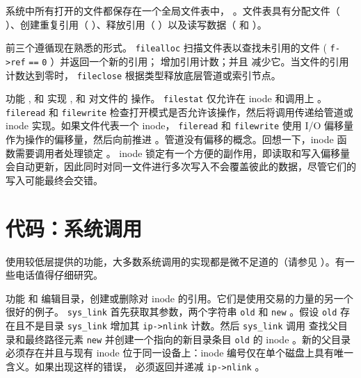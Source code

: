 系统中所有打开的文件都保存在一个全局文件表中，
        。文件表具有分配文件（        ）、创建重复引用（        ）、释放引用（        ）以及读写数据（        和
       ）。  

前三个遵循现在熟悉的形式。
    \lstinline{filealloc}   
        扫描文件表以查找未引用的文件 (    \lstinline{f->ref}   
    \lstinline{==}   
    \lstinline{0}    ）并返回一个新的引用；
        增加引用计数；并且
        减少它。当文件的引用计数达到零时，
    \lstinline{fileclose}    根据类型释放底层管道或索引节点。  

功能
        ,
        和
        实现
        ,
        和
 对文件的        操作。
    \lstinline{filestat}   
        仅允许在 inode 和调用上
        。
    \lstinline{fileread}    和
    \lstinline{filewrite}    检查打开模式是否允许该操作，然后将调用传递给管道或 inode 实现。如果文件代表一个 inode，
    \lstinline{fileread}    和
    \lstinline{filewrite}    使用 I/O 偏移量作为操作的偏移量，然后向前推进
        。管道没有偏移的概念。回想一下，inode 函数需要调用者处理锁定
        。 inode 锁定有一个方便的副作用，即读取和写入偏移量会自动更新，因此同时对同一文件进行多次写入不会覆盖彼此的数据，尽管它们的写入可能最终会交错。
    \section{代码：系统调用  }     

使用较低层提供的功能，大多数系统调用的实现都是微不足道的（请参见
        ）。有一些电话值得仔细研究。  

功能
        和
        编辑目录，创建或删除对 inode 的引用。它们是使用交易的力量的另一个很好的例子。
    \lstinline{sys_link}   
        首先获取其参数，两个字符串
    \lstinline{old}    和
    \lstinline{new}   
        。假设
    \lstinline{old}    存在且不是目录
    \lstinline{sys_link}    增加其
    \lstinline{ip->nlink}    计数。然后
    \lstinline{sys_link}    调用
        查找父目录和最终路径元素
    \lstinline{new}   
        并创建一个指向的新目录条目
    \lstinline{old}    的 inode
        。新的父目录必须存在并且与现有 inode 位于同一设备上：inode 编号仅在单个磁盘上具有唯一含义。如果出现这样的错误，
        必须返回并递减
    \lstinline{ip->nlink}    。  

